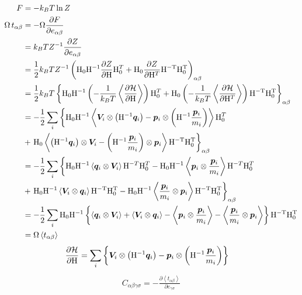 \documentclass[11pt,a4paper,uplatex]{jsarticle}
\begin{document}
\begin{align}
    F &= - k_{B} T  \ln Z \\
    \Omega \, t_{\alpha \beta} &= - \Omega \frac{\partial F}{\partial e_{\alpha \beta}} \\
    &= k_{B} T Z^{-1} \frac{\partial Z}{\partial e_{\alpha \beta}} \\
    &= \frac{1}{2} k_{B} T Z^{-1} \left({\rm H_{0}H^{-1}}\frac{\partial Z}{\partial {\rm H}}{\rm H}_{0}^{T} + {\rm H_{0}}\frac{\partial Z}{\partial {\rm H}^T}{\rm H^{-T}}{\rm H_{0}^{T}}\right)_{\alpha \beta} \\ 
    &= \frac{1}{2} k_{B} T \left\{ {\rm H_{0}H^{-1}}\left(-\frac{1}{k_{B}T} \left< \frac{\partial {\cal H}}{\partial {\rm H}}\right> \right){\rm H}_{0}^{T}  
    + {\rm H_{0}} \left(-\frac{1}{k_{B}T} \left< \frac{\partial {\cal H}}{\partial {\rm H}^{T}}\right> \right){\rm H^{-T}}{\rm H_{0}^{T}}\right\}_{\alpha \beta} \\  
    &= -\frac{1}{2} \sum_{i} \left\{ {\rm H_{0}H^{-1}}\left< \bm{V}_{i}  \otimes \left({\rm H}^{-1} \bm{q}_{i}\right) - \bm{p}_{i} \otimes \left( {\rm H}^{-1}\frac{\bm{p}_{i}}{m_{i}}  \right)  \right> {\rm H}_{0}^{T} \right.\\
    &+ \left. {\rm H_{0}} \left< \left({\rm H}^{-1} \bm{q}_{i}\right) \otimes \bm{V}_{i}
    -  \left( {\rm H}^{-1}\frac{\bm{p}_{i}}{m_{i}}  \right) \otimes \bm{p}_{i} \right> {\rm H^{-T}}{\rm H_{0}^{T}}\right\}_{\alpha \beta} \\ 
    &= -\frac{1}{2} \sum_{i} \left\{ {\rm H_{0}H^{-1}}\left< \bm{q}_{i} \otimes \bm{V}_{i} \right> {\rm H}^{-T} {\rm H}_{0}^{T} - {\rm H_{0} H^{-1}} \left<\bm{p}_{i} \otimes \frac{\bm{p}_{i}}{m_{i}}   \right> {\rm H}^{-T} {\rm H}_{0}^{T} \right.\\
    &+ \left. {\rm H_{0}}{\rm H}^{-1}  \left< \bm{V}_{i} \otimes  \bm{q}_{i} \right> {\rm H^{-T} H_{0}^{T}} 
    -   {\rm H_{0} H}^{-1} \left< \frac{\bm{p}_{i}}{m_{i}} \otimes \bm{p}_{i} \right> {\rm H^{-T}}{\rm H_{0}^{T}}\right\}_{\alpha \beta} \\
    &= -\frac{1}{2} \sum_{i} {\rm H_{0}H^{-1}} \left\{ \left< \bm{q}_{i} \otimes \bm{V}_{i} \right>  + \left< \bm{V}_{i} \otimes  \bm{q}_{i} \right> - \left<\bm{p}_{i} \otimes \frac{\bm{p}_{i}}{m_{i}}   \right>  
    -  \left< \frac{\bm{p}_{i}}{m_{i}} \otimes \bm{p}_{i} \right> \right\} {\rm H^{-T}}{\rm H_{0}^{T}} \\
    &= \Omega \left< t_{\alpha \beta} \right>
\end{align}
\begin{align}
\frac{\partial {\cal H}}{\partial {\rm H}} &= \sum_{i} \left\{ \bm{V}_{i} \otimes \left({\rm H}^{-1} \bm{q}_{i}\right)
- \bm{p}_{i} \otimes \left( {\rm H}^{-1}\frac{\bm{p}_{i}}{m_{i}}  \right) \right\}     
\end{align}
\begin{align}
    C_{\alpha \beta \gamma \sigma} = -\frac{\partial \left< t_{\alpha \beta} \right>}{\partial e_{\gamma \sigma}}
\end{align}

%
\end{document}
